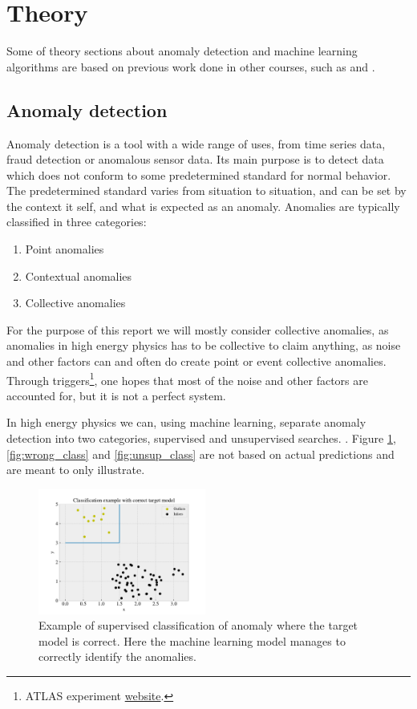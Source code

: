 \documentclass[ reprint, amsmath,amssymb, aps, nofootinbib]{revtex4-2}
\begin{document}
\section{Theory}
Some of theory sections about anomaly detection and machine learning algorithms are based on previous work done in other courses, such as \cite{FYSSTK} and \cite{ML_PROJ}.

\subsection{Anomaly detection}

Anomaly detection is a tool with a wide range of uses, from time series data, fraud detection or anomalous sensor data. Its main purpose is to detect data which does not conform to some predetermined standard for normal behavior. The predetermined standard varies from situation to situation, and can be set by the context it self, and what is expected as an anomaly. Anomalies are typically classified in three categories\cite{anom_detec}:
\begin{enumerate}
    \item Point anomalies
    \item Contextual anomalies
    \item Collective anomalies
\end{enumerate}


For the purpose of this report we will mostly consider collective anomalies, as anomalies in high energy physics has to be collective to claim anything, as noise and other factors can and often do create point or event collective anomalies. Through triggers\footnote{ATLAS experiment \href{https://atlas.cern/Discover/Detector/Trigger-DAQ}{website}.}, one hopes that most of the noise and other factors are accounted for, but it is not a perfect system.\par 

In high energy physics we can, using machine learning, separate anomaly detection into two categories, supervised and unsupervised searches. . Figure \ref{fig:corr_class}, \ref{fig:wrong_class} and \ref{fig:unsup_class} are not based on actual predictions and are meant to only illustrate.

\begin{figure}[H]
    \centering
    \includegraphics[width=0.49\textwidth]{figures/theory/correct_class.pdf}
    \caption{Example of supervised classification of anomaly where the target model is correct. Here the machine learning model manages to correctly identify the anomalies. }
    \label{fig:corr_class}
\end{figure}
\end{document}
